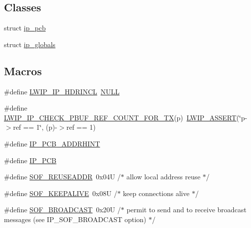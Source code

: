 \subsection*{Classes}
\begin{DoxyCompactItemize}
\item 
struct \hyperlink{structip__pcb}{ip\+\_\+pcb}
\item 
struct \hyperlink{structip__globals}{ip\+\_\+globals}
\end{DoxyCompactItemize}
\subsection*{Macros}
\begin{DoxyCompactItemize}
\item 
\#define \hyperlink{openmote-cc2538_2lwip_2src_2include_2lwip_2ip_8h_a2b7dff1859ced5f2be3fc3da231819d7}{L\+W\+I\+P\+\_\+\+I\+P\+\_\+\+H\+D\+R\+I\+N\+CL}~\hyperlink{openmote-cc2538_2lwip_2src_2include_2lwip_2def_8h_a070d2ce7b6bb7e5c05602aa8c308d0c4}{N\+U\+LL}
\item 
\#define \hyperlink{openmote-cc2538_2lwip_2src_2include_2lwip_2ip_8h_a355679dba1c0d8ef07ce3abcd28e3063}{L\+W\+I\+P\+\_\+\+I\+P\+\_\+\+C\+H\+E\+C\+K\+\_\+\+P\+B\+U\+F\+\_\+\+R\+E\+F\+\_\+\+C\+O\+U\+N\+T\+\_\+\+F\+O\+R\+\_\+\+TX}(p)~\hyperlink{openmote-cc2538_2lwip_2src_2include_2lwip_2debug_8h_a94ad086267808462beae2b38f91996ed}{L\+W\+I\+P\+\_\+\+A\+S\+S\+E\+RT}(\char`\"{}p-\/$>$ref == 1\char`\"{}, (p)-\/$>$ref == 1)
\item 
\#define \hyperlink{openmote-cc2538_2lwip_2src_2include_2lwip_2ip_8h_a19a7497f9c87e25b66382e1b92f56382}{I\+P\+\_\+\+P\+C\+B\+\_\+\+A\+D\+D\+R\+H\+I\+NT}
\item 
\#define \hyperlink{openmote-cc2538_2lwip_2src_2include_2lwip_2ip_8h_a8bdf4b5f674375e76cdd968826d80e53}{I\+P\+\_\+\+P\+CB}
\item 
\#define \hyperlink{openmote-cc2538_2lwip_2src_2include_2lwip_2ip_8h_aa40b3366a7939ec3a60e9a7d239575e2}{S\+O\+F\+\_\+\+R\+E\+U\+S\+E\+A\+D\+DR}~0x04\+U  /$\ast$ allow local address reuse $\ast$/
\item 
\#define \hyperlink{openmote-cc2538_2lwip_2src_2include_2lwip_2ip_8h_a1f7f7efb095c77c06af5c5e8ba558d45}{S\+O\+F\+\_\+\+K\+E\+E\+P\+A\+L\+I\+VE}~0x08\+U  /$\ast$ keep connections alive $\ast$/
\item 
\#define \hyperlink{openmote-cc2538_2lwip_2src_2include_2lwip_2ip_8h_ac8c7ccdad2d7d3a264bd8cfc57140ca8}{S\+O\+F\+\_\+\+B\+R\+O\+A\+D\+C\+A\+ST}~0x20\+U  /$\ast$ permit to send and to receive broadcast messages (see I\+P\+\_\+\+S\+O\+F\+\_\+\+B\+R\+O\+A\+D\+C\+A\+S\+T option) $\ast$/

\end{DoxyCompactItemize}
